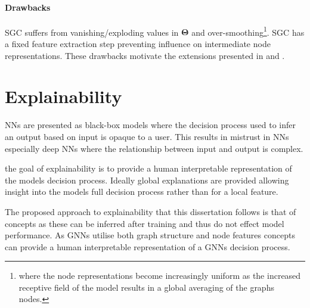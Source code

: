 \paragraph{Drawbacks}
SGC suffers from vanishing/exploding values in $\bm{\Theta}$ and over-smoothing\footnote{where the node representations become increasingly uniform as the increased receptive field of the model results in a global averaging of the graphs nodes.}.
SGC has a fixed feature extraction step preventing influence on intermediate node representations.
These drawbacks motivate the extensions presented in  and .




\section{Explainability}




NNs are presented as black-box models where the decision process used to infer an output based on input is opaque to a user.
This results in mistrust in NNs especially deep NNs where the relationship between input and output is complex.

the goal of explainability is to provide a human interpretable representation of the models decision process.
Ideally global explanations are provided allowing insight into the models full decision process rather than for a local feature.

The proposed approach to explainability that this dissertation follows is that of concepts as these can be inferred after training and thus do not effect model performance.
As GNNs utilise both graph structure and node features concepts can provide a human interpretable representation of a GNNs decision process.


